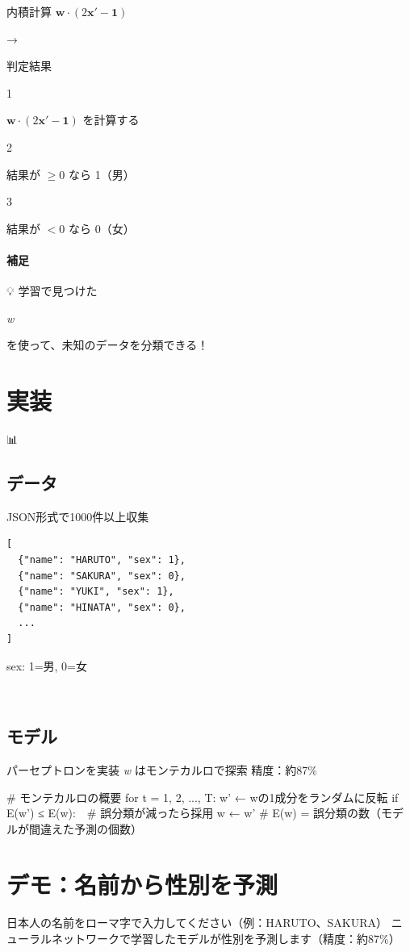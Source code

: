 \documentclass[uplatex,dvipdfmx,11pt,a4paper,openany]{bxjsbook}
\begin{document}
内積計算\allowbreak{} \( \mathbf{w} \cdot (2\mathbf{x}' - \mathbf{1}) \)

→

判定結果

1

\( \mathbf{w} \cdot (2\mathbf{x}' - \mathbf{1}) \) を計算する

2

結果が \( \ge 0 \) なら 1（男）

3

結果が \( < 0 \) なら 0（女）

\paragraph{補足}
💡 学習で見つけた

\emph{w}

を使って、未知のデータを分類できる！


\section{実装}
📊

\subsection{データ}
JSON形式で1000件以上収集

\begin{verbatim}
[
  {"name": "HARUTO", "sex": 1},
  {"name": "SAKURA", "sex": 0},
  {"name": "YUKI", "sex": 1},
  {"name": "HINATA", "sex": 0},
  ...
]
\end{verbatim}

sex: 1=男, 0=女

🤖

\subsection{モデル}
パーセプトロンを実装\allowbreak{} 
\emph{w} はモンテカルロで探索\allowbreak{} \allowbreak{} 
精度：約87\%

\# モンテカルロの概要\allowbreak{} 
for t = 1, 2, ..., T:\allowbreak{} 
                w' ← wの1成分をランダムに反転\allowbreak{} 
                if E(w') ≤ E(w):　\# 誤分類が減ったら採用\allowbreak{} 
                    w ← w'\allowbreak{} 
\# E(w) = 誤分類の数（モデルが間違えた予測の個数）

\section{デモ：名前から性別を予測 🔮}
日本人の名前をローマ字で入力してください（例：HARUTO、SAKURA）\allowbreak{} 
        ニューラルネットワークで学習したモデルが性別を予測します（精度：約87\%）
\end{document}
